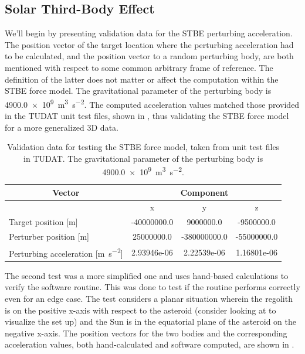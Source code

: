 \subsection{Solar Third-Body Effect}
\label{subsec:stbe_vv}
We'll begin by presenting validation data for the \gls{STBE} perturbing acceleration. The position vector of the target location where the perturbing acceleration had to be calculated, and the position vector to a random perturbing body, are both mentioned with respect to some common arbitrary frame of reference. The definition of the latter does not matter or affect the computation within the \gls{STBE} force model. The gravitational parameter of the perturbing body is \SI{4900.0e9}{\metre \cubed \per \second \squared}. The computed acceleration values matched those provided in the \gls{TUDAT} unit test files, shown in , thus validating the \gls{STBE} force model for a more generalized 3D data.
\begin{table}[htb]
\centering
\captionsetup{justification=centering}
\caption{Validation data for testing the \gls{STBE} force model, taken from unit test files in \gls{TUDAT}. The gravitational parameter of the perturbing body is \SI{4900.0e9}{\metre \cubed \per \second \squared}.}
\label{tab:stbe_vv_tudat_data}
\begin{tabular}{|l|c|c|c|}
\hline
\multicolumn{1}{|c|}{\textbf{Vector}} & \multicolumn{3}{c|}{\textbf{Component}} \\ \hline
\multicolumn{1}{|c|}{} & x & y & z \\ \hline
Target position {[}m{]} & -40000000.0 & 9000000.0 & -9500000.0 \\ \hline
Perturber position {[}m{]} & 25000000.0 & -380000000.0 & -55000000.0 \\ \hline
Perturbing acceleration {[}\si{\metre \per \second \squared}{]} & 2.93946e-06 & 2.22539e-06 & 1.16801e-06 \\ \hline
\end{tabular}
\end{table}
\FloatBarrier
The second test was a more simplified one and uses hand-based calculations to verify the software routine. This was done to test if the routine performs correctly even for an edge case. The test considers a planar situation wherein the regolith is on the positive x-axis with respect to the asteroid (consider looking at  to visualize the set up) and the Sun is in the equatorial plane of the asteroid on the negative x-axis. The position vectors for the two bodies and the corresponding acceleration values, both hand-calculated and software computed, are shown in .
